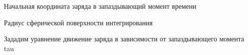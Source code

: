 \documentclass{article}
\begin{document}
\begin{Maple Normal}{
\begin{Maple Normal}{
}\end{Maple Normal}
}\end{Maple Normal}
\begin{Maple Normal}{
\begin{Maple Normal}{
}\end{Maple Normal}
}\end{Maple Normal}
\begin{Maple Normal}{
\begin{Maple Normal}{
Начальная координата заряда в запаздывающий момент времени 
}\end{Maple Normal}

}\end{Maple Normal}

\begin{Maple Normal}{
\begin{Maple Normal}{
}\end{Maple Normal}
}\end{Maple Normal}
\begin{Maple Normal}{
\begin{Maple Normal}{
}\end{Maple Normal}
}\end{Maple Normal}
\begin{Maple Normal}{
\begin{Maple Normal}{
Радиус сферической поверхности интегрирования}\end{Maple Normal}

}\end{Maple Normal}

\begin{Maple Normal}{
\begin{Maple Normal}{
}\end{Maple Normal}
}\end{Maple Normal}
\begin{Maple Normal}{
\begin{Maple Normal}{
}\end{Maple Normal}
}\end{Maple Normal}
\begin{Maple Normal}{
\begin{Maple Normal}{
Зададим уравнение движение заряда в зависимости от запаздывающего момента tau}\end{Maple Normal}

}\end{Maple Normal}
\end{document}
